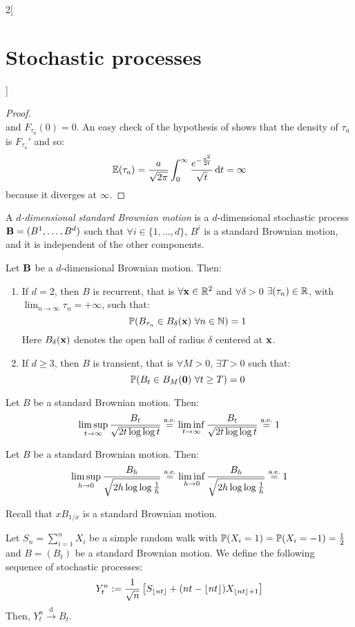 \documentclass[../../../main_math.tex]{subfiles}
\begin{document}
\begin{multicols}{2}[\section{Stochastic processes}]
\begin{proof}
$$    $$
    and $F_{\tau_a}(0)=0$. An easy check of the hypothesis of  shows that the density of $\tau_a$ is ${F_{\tau_a}}'$ and so:
    $$
      \mathbb{E}(\tau_a)=\frac{a}{\sqrt{2\pi}}\int_{0}^{\infty} \frac{e^{-\frac{a^2}{2t}}}{\sqrt{t}}\dd{t}=\infty
    $$
    because it diverges at $\infty$.
  \end{proof}
  \begin{definition}
    A \emph{$d$-dimensional standard Brownian motion} is a $d$-dimensional stochastic process $\boldsymbol{\mathrm{B}}=(B^1,\dots,B^d)$ such that $\forall i\in\{1,\dots,d\}$, $B^i$ is a standard Brownian motion, and it is independent of the other components.
  \end{definition}
  \begin{theorem}
    Let $\boldsymbol{\mathrm{B}}$ be a $d$-dimensional Brownian motion. Then:
    \begin{enumerate}
      \item If $d=2$, then $B$ is recurrent, that is $\forall \boldsymbol{\mathrm{x}}\in\mathbb{R}^2$ and $\forall \delta>0$ $\exists (\tau_n)\in\mathbb{R}$, with $\displaystyle\lim_{n\to\infty} \tau_n=+\infty$, such that: $$\mathbb{P}(B_{\tau_n}\in B_\delta(\boldsymbol{\mathrm{x}})\ \forall n\in\mathbb{N})=1$$ Here $B_\delta(\boldsymbol{\mathrm{x}})$ denotes the open ball of radius $\delta$ centered at $\boldsymbol{\mathrm{x}}$.
      \item If $d\geq 3$, then $B$ is transient, that is $\forall M>0$, $\exists T>0$ such that: $$\Prob(B_t\in B_M(\vf{0})\ \forall t\geq T)=0$$
    \end{enumerate}
  \end{theorem}
  \begin{theorem}
    Let $B$ be a standard Brownian motion. Then:
    $$
      \limsup_{t\to\infty}\frac{B_t}{\sqrt{2t\log\log t}}\overset{\text{a.e.}}{=}\liminf_{t\to\infty}\frac{B_t}{\sqrt{2t\log\log t}}\overset{\text{a.e.}}{=}1
    $$
  \end{theorem}
  \begin{corollary}
    Let $B$ be a standard Brownian motion. Then:
    $$
      \limsup_{h\to 0} \frac{B_h}{\sqrt{2h\log\log\frac{1}{h}}}\overset{\text{a.e.}}{=}\liminf_{h\to 0} \frac{B_h}{\sqrt{2h\log\log\frac{1}{h}}}\overset{\text{a.e.}}{=}1
    $$
  \end{corollary}
  \begin{sproof}
    Recall that $xB_{1/x}$ is a standard Brownian motion.
  \end{sproof}
  \begin{proposition}
    Let $S_n=\sum_{i=1}^n X_i$ be a simple random walk with $\mathbb{P}(X_i=1)=\mathbb{P}(X_i=-1)=\frac{1}{2}$ and $B=(B_t)$ be a standard Brownian motion. We define the following sequence of stochastic processes:
    $$
      {Y_t^n}:=\frac{1}{\sqrt{n}}\left[S_{\left\lfloor nt \right\rfloor}+(nt-\left\lfloor nt \right\rfloor)X_{\left\lfloor nt \right\rfloor+1}\right]
    $$
    Then, $Y_t^n\overset{\mathrm{d}}{\longrightarrow} B_t$.
  \end{proposition}

\end{multicols}
\end{document}
